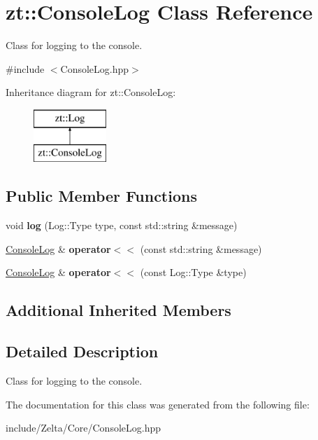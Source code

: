 \hypertarget{classzt_1_1_console_log}{}\section{zt\+:\+:Console\+Log Class Reference}
\label{classzt_1_1_console_log}


Class for logging to the console.  




{\ttfamily \#include $<$Console\+Log.\+hpp$>$}

Inheritance diagram for zt\+:\+:Console\+Log\+:\begin{figure}[H]
\begin{center}
\leavevmode
\includegraphics[height=2.000000cm]{classzt_1_1_console_log}
\end{center}
\end{figure}
\subsection*{Public Member Functions}
\begin{DoxyCompactItemize}
\item 
\mbox{\label{classzt_1_1_console_log_a79bda0ffa25340ce72ded1cd12d4374b}} 
void {\bfseries log} (Log\+::\+Type type, const std\+::string \&message)
\item 
\mbox{\label{classzt_1_1_console_log_a3aa1b87161676976d85aaf34dbd9608d}} 
\hyperlink{classzt_1_1_console_log}{Console\+Log} \& {\bfseries operator$<$$<$} (const std\+::string \&message)
\item 
\mbox{\label{classzt_1_1_console_log_abae5752feb7fb6bc7ed4c4cf22e04338}} 
\hyperlink{classzt_1_1_console_log}{Console\+Log} \& {\bfseries operator$<$$<$} (const Log\+::\+Type \&type)
\end{DoxyCompactItemize}
\subsection*{Additional Inherited Members}


\subsection{Detailed Description}
Class for logging to the console. 

The documentation for this class was generated from the following file\+:\begin{DoxyCompactItemize}
\item 
include/\+Zelta/\+Core/Console\+Log.\+hpp\end{DoxyCompactItemize}
